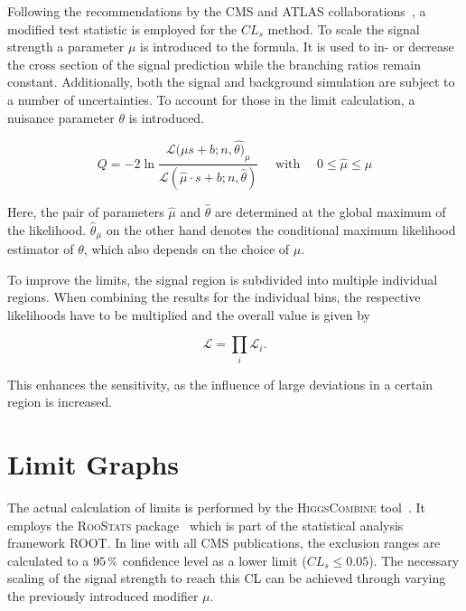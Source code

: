 Following the recommendations by the CMS and ATLAS collaborations~\cite{clsmod}, a modified test statistic is employed for the $CL_s$ method. To scale the signal strength a parameter $\mu$ is introduced to the formula. It is used to in- or decrease the cross section of the signal prediction while the branching ratios remain constant. Additionally, both the signal and background simulation are subject to a number of uncertainties. To account for those in the limit calculation, a nuisance parameter $\theta$ is introduced.

\begin{equation}
  \label{eq:q-mod}
  Q = - 2 \ln{ \frac{\mathcal{L} (\mu s + b; n, \hat{\theta)}_\mu }{\mathcal{L} (\hat{\mu} \cdot s + b; n, \hat{\theta} )} } \quad \text{ with } \quad 0 \leq \hat{\mu} \leq \mu
\end{equation}

\noindent Here, the pair of parameters $\hat{\mu}$ and $\hat{\theta}$ are determined at the global maximum of the likelihood. $\hat{\theta}_\mu$ on the other hand denotes the conditional maximum likelihood estimator of $\theta$, which also depends on the choice of $\mu$.


To improve the limits, the signal region is subdivided into multiple individual regions. When combining the results for the individual bins, the respective likelihoods have to be multiplied and the overall value is given by

\begin{equation}
  \label{eq:likelihood-product}
  \mathcal{L} = \prod_i \mathcal{L}_i.
\end{equation}

\noindent This enhances the sensitivity, as the influence of large deviations in a certain region is increased.

\section{Limit Graphs}
\label{sec:limit-graphs}

The actual calculation of limits is performed by the \textsc{HiggsCombine} tool~\cite{clsmod,higgscombine}. It employs the \textsc{RooStats} package~\cite{roostats} which is part of the statistical analysis framework \textsc{ROOT}. In line with all CMS publications, the exclusion ranges are calculated to a $95\,\pct$ confidence level as a lower limit ($CL_s \leq 0.05$). The necessary scaling of the signal strength to reach this CL can be achieved through varying the previously introduced modifier $\mu$.

